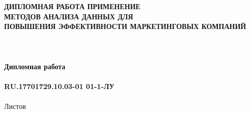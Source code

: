 \documentclass{article}
\begin{document}
\fontsize{14}{16}\selectfont
\thispagestyle{empty}
\clearpage
{}
\bigskip
\begin{center}
\topskip=0pt
\vspace*{\fill}
\textbf{ДИПЛОМНАЯ РАБОТА ПРИМЕНЕНИЕ\\
МЕТОДОВ АНАЛИЗА ДАННЫХ ДЛЯ\\
ПОВЫШЕНИЯ ЭФФЕКТИВНОСТИ МАРКЕТИНГОВЫХ КОМПАНИЙ\\
~\\
~\\
~\\
Дипломная работа\\
~\\
RU.17701729.10.03-01 01-1-ЛУ}\\
~\\
Листов \ztotpages\\
\vspace*{\fill}
\end{center}
\begin{center}
\end{center}
\newpage
\tableofcontents
\newpage
\newpage
\end{document}
